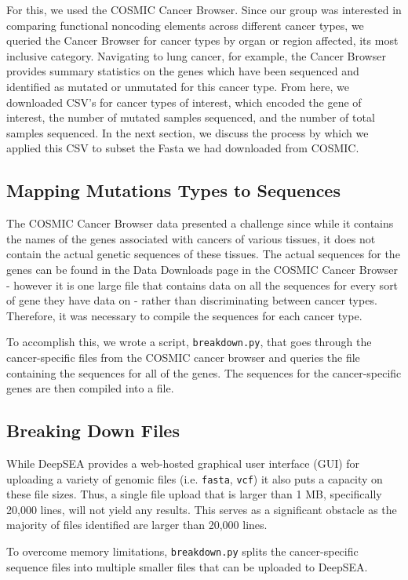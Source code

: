 \documentclass{article}
\begin{document}
For this, we used the COSMIC Cancer Browser. Since our group was interested in comparing functional noncoding elements across different cancer types, we queried the Cancer Browser for cancer types by organ or region affected, its most inclusive category. Navigating to lung cancer, for example, the Cancer Browser provides summary statistics on the genes which have been sequenced and identified as mutated or unmutated for this cancer type. From here, we downloaded CSV's for cancer types of interest, which encoded the gene of interest, the number of mutated samples sequenced, and the number of total samples sequenced. In the next section, we discuss the process by which we applied this CSV to subset the Fasta we had downloaded from COSMIC.

\subsection{Mapping Mutations Types to Sequences}
The COSMIC Cancer Browser data presented a challenge since while it contains the names of the genes associated with cancers of various tissues, it does not contain the actual genetic sequences of these tissues. 
The actual sequences for the genes can be found in the Data Downloads page in the COSMIC Cancer Browser - however it is one large file that contains data on all the sequences for every sort of gene they have data on - rather than discriminating between cancer types. Therefore, it was necessary to compile the sequences for each cancer type.

To accomplish this, we wrote a script, \texttt{breakdown.py}, that goes through the cancer-specific files from the COSMIC cancer browser and queries the file containing the sequences for all of the genes. The sequences for the cancer-specific genes are then compiled into a file. 



\subsection{Breaking Down Files}
While DeepSEA provides a web-hosted graphical user interface (GUI) for uploading a variety of genomic files (i.e. \texttt{fasta}, \texttt{vcf}) it also puts a capacity on these file sizes. Thus, a single file upload that is larger than 1 MB, specifically 20,000 lines, will not yield any results. This serves as a significant obstacle as the majority of files identified are larger than 20,000 lines.

To overcome memory limitations, \texttt{breakdown.py} splits the cancer-specific sequence files into multiple smaller files that can be uploaded to DeepSEA.
\end{document}
